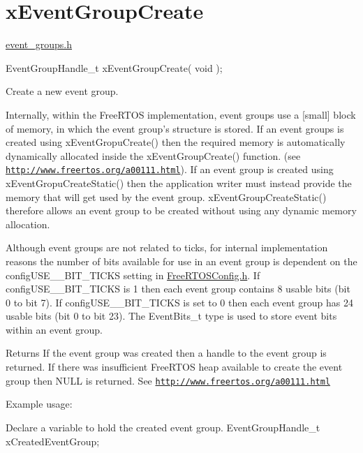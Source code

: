 \hypertarget{group__xEventGroupCreate}{\section{x\-Event\-Group\-Create}
\label{group__xEventGroupCreate}
}
\hyperlink{event__groups_8h}{event\-\_\-groups.\-h} 
\begin{DoxyPre}
 EventGroupHandle\_t xEventGroupCreate( void );
 \end{DoxyPre}


Create a new event group.

Internally, within the Free\-R\-T\-O\-S implementation, event groups use a \mbox{[}small\mbox{]} block of memory, in which the event group's structure is stored. If an event groups is created using x\-Event\-Gropu\-Create() then the required memory is automatically dynamically allocated inside the x\-Event\-Group\-Create() function. (see \href{http://www.freertos.org/a00111.html}{\tt http\-://www.\-freertos.\-org/a00111.\-html}). If an event group is created using x\-Event\-Gropu\-Create\-Static() then the application writer must instead provide the memory that will get used by the event group. x\-Event\-Group\-Create\-Static() therefore allows an event group to be created without using any dynamic memory allocation.

Although event groups are not related to ticks, for internal implementation reasons the number of bits available for use in an event group is dependent on the config\-U\-S\-E\-\_\-\_\-\-B\-I\-T\-\_\-\-T\-I\-C\-K\-S setting in \hyperlink{FreeRTOSConfig_8h}{Free\-R\-T\-O\-S\-Config.\-h}. If config\-U\-S\-E\-\_\-\_\-\-B\-I\-T\-\_\-\-T\-I\-C\-K\-S is 1 then each event group contains 8 usable bits (bit 0 to bit 7). If config\-U\-S\-E\-\_\-\_\-\-B\-I\-T\-\_\-\-T\-I\-C\-K\-S is set to 0 then each event group has 24 usable bits (bit 0 to bit 23). The Event\-Bits\-\_\-t type is used to store event bits within an event group.

\begin{DoxyReturn}{Returns}
If the event group was created then a handle to the event group is returned. If there was insufficient Free\-R\-T\-O\-S heap available to create the event group then N\-U\-L\-L is returned. See \href{http://www.freertos.org/a00111.html}{\tt http\-://www.\-freertos.\-org/a00111.\-html}
\end{DoxyReturn}
Example usage\-: 
\begin{DoxyPre}
Declare a variable to hold the created event group.
    EventGroupHandle\_t xCreatedEventGroup;\end{DoxyPre}



